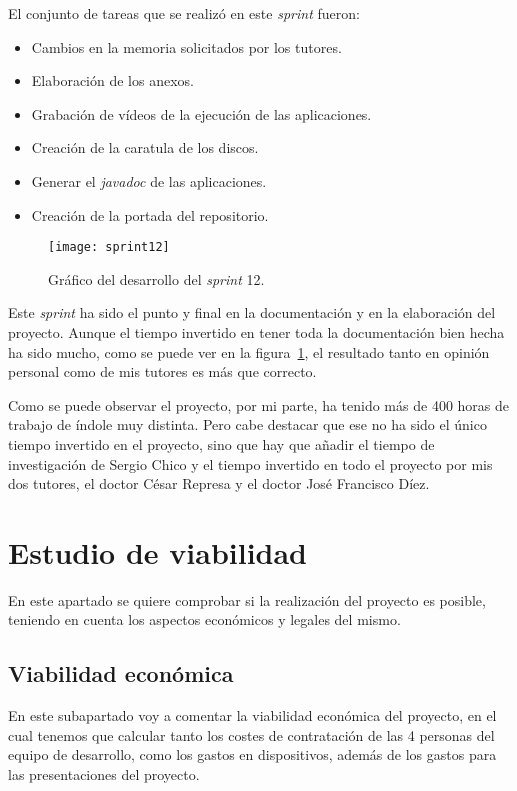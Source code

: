 El conjunto de tareas que se realizó en este \textit{sprint} fueron:
\begin{itemize}
	\item Cambios en la memoria solicitados por los tutores.
	\item Elaboración de los anexos.
	\item Grabación de vídeos de la ejecución de las aplicaciones.
	\item Creación de la caratula de los discos.
	\item Generar el \textit{javadoc} de las aplicaciones.
	\item Creación de la portada del repositorio.
\end{itemize}

\begin{figure}
	\centering
	\texttt{[image: sprint12]}
	\caption{Gráfico del desarrollo del \textit{sprint} 12.}
	\label{fig:sprint12}
\end{figure}

Este \textit{sprint} ha sido el punto y final en la documentación y en la elaboración del proyecto. Aunque el tiempo invertido en tener toda la documentación bien hecha ha sido mucho, como se puede ver en la figura~\ref{fig:sprint12}, el resultado tanto en opinión personal como de mis tutores es más que correcto.

Como se puede observar el proyecto, por mi parte, ha tenido más de 400 horas de trabajo de índole muy distinta. Pero cabe destacar que ese no ha sido el único tiempo invertido en el proyecto, sino que hay que añadir el tiempo de investigación de Sergio Chico y el tiempo invertido en todo el proyecto por mis dos tutores, el doctor César Represa y el doctor José Francisco Díez.
\section{Estudio de viabilidad}
En este apartado se quiere comprobar si la realización del proyecto es posible, teniendo en cuenta los aspectos económicos y legales del mismo.
\subsection{Viabilidad económica}
En este subapartado voy a comentar la viabilidad económica del proyecto, en el cual tenemos que calcular tanto los costes de contratación de las 4 personas del equipo de desarrollo, como los gastos en dispositivos, además de los gastos para las presentaciones del proyecto.

